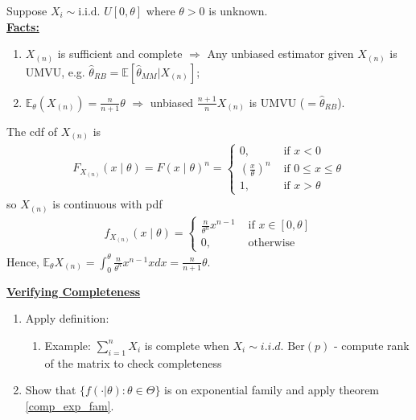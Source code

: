 \documentclass[11pt]{elegantbook}
\begin{document}
\begin{example}\quad
    Suppose $X_i\sim \text{i.i.d. } U[0,\theta]$ where $\theta>0$ is unknown.\\
    \textbf{\underline{Facts:}}
    \begin{enumerate}[$\bullet$]
        \item $X_{(n)}$ is sufficient and complete $\Rightarrow$
        Any unbiased estimator given $X_{(n)}$ is UMVU, e.g. $\hat{\theta}_{RB}=\mathbb{E}[\hat{\theta}_{MM}|X_{(n)}]$;
        \item $\mathbb{E}_\theta(X_{(n)})=\frac{n}{n+1}\theta$ $\Rightarrow$ unbiased $\frac{n+1}{n}X_{(n)}$ is UMVU ($=\hat{\theta}_{RB}$).
    \end{enumerate}
    \begin{remark}
        The cdf of $X_{(n)}$ is
        \begin{equation}
            \begin{aligned}
                F_{X_{(n)}}(x\mid\theta)=F(x\mid\theta)^n=\left\{\begin{matrix}
                    0,&\text{ if }x<0\\
                    \left(\frac{x}{\theta}\right)^n&\text{ if }0\leq x\leq \theta\\
                    1,&\text{ if }x>\theta
                \end{matrix}\right.
            \end{aligned}
            \nonumber
        \end{equation}
        so $X_{(n)}$ is continuous with pdf
        \begin{equation}
            \begin{aligned}
                f_{X_{(n)}}(x\mid\theta)=\left\{\begin{matrix}
                    \frac{n}{\theta^n}x^{n-1}&\text{ if }x\in[0,\theta]\\
                    0,& \text{ otherwise}
                \end{matrix}\right.
            \end{aligned}
            \nonumber
        \end{equation}
        Hence, $\mathbb{E}_\theta X_{(n)}=\int_0^\theta \frac{n}{\theta^n}x^{n-1} x dx = \frac{n}{n+1}\theta$.
    \end{remark}
\end{example}

\textbf{\underline{Verifying Completeness}}
\begin{enumerate}[$\bullet$]
    \item Apply definition:
    \begin{enumerate}[$\circ$]
        \item Example: $\sum_{i=1}^n X_i$ is complete when $X_i\sim i.i.d. \text{ Ber}(p)$ - compute rank of the matrix to check completeness
    \end{enumerate}
    \item Show that $\{f(\cdot|\theta):\theta\in\Theta\}$ is on exponential family and apply theorem \ref{comp_exp_fam}.
\end{enumerate}
\end{document}
